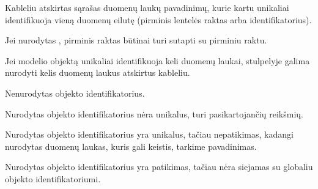 \documentclass[letterpaper,10pt,lithuanian]{sphinxmanual}
\begin{document}
\begin{fulllineitems}
\label{\detokenize{dimensijos:model.ref}}
\pysigstartsignatures
{}
\pysigstopsignatures
\sphinxAtStartPar
Kableliu atskirtas sąrašas {\hyperref[\detokenize{dimensijos:model.property}]{}} duomenų laukų pavadinimų,
kurie kartu unikaliai identifikuoja vieną duomenų eilutę (pirminis lentelės
raktas arba identifikatorius).

\sphinxAtStartPar
Jei nurodytas {\hyperref[\detokenize{dimensijos:model.type}]{}}, pirminis raktas būtinai turi sutapti su
{\hyperref[\detokenize{dimensijos:model.type}]{}} pirminiu raktu.

\sphinxAtStartPar
Jei modelio objektą unikaliai identifikuoja keli duomenų laukai,
{\hyperref[\detokenize{dimensijos:model.ref}]{}} stulpelyje galima nurodyti kelis duomenų laukus atskirtus
kableliu.

\begin{sphinxShadowBox}
\begin{description}
\sphinxAtStartPar
Nenurodytas objekto identifikatorius.

\sphinxAtStartPar
Nurodytas objekto identifikatorius nėra unikalus, turi
pasikartojančių reikšmių.

\sphinxAtStartPar
Nurodytas objekto identifikatorius yra unikalus, tačiau
nepatikimas, kadangi nurodytas duomenų laukas, kuris gali keistis,
tarkime pavadinimas.

\sphinxAtStartPar
Nurodytas objekto identifikatorius yra patikimas, tačiau nėra
siejamas su globaliu objekto identifikatoriumi.

\end{description}
\end{sphinxShadowBox}

\end{fulllineitems}
\end{document}
